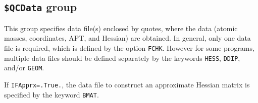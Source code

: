 \documentclass[12pt,english]{extarticle}
\begin{document}
\subsection{\texttt{\$QCData} group} \label{sec:inp-qcdata}

This group specifies data file(s) enclosed by quotes, where the data (atomic
masses, coordinates, APT, and Hessian) are obtained. In general,
only one data file is required, which is defined by the option
\verb|FCHK|. However for some programs, multiple data files should be
defined separately by the keywords \verb|HESS|, \verb|DDIP|, and/or
\verb|GEOM|.

If \verb|IFApprx=.True.|, the data file to construct an approximate Hessian matrix is specified by the keyword \verb|BMAT|.

\end{document}
